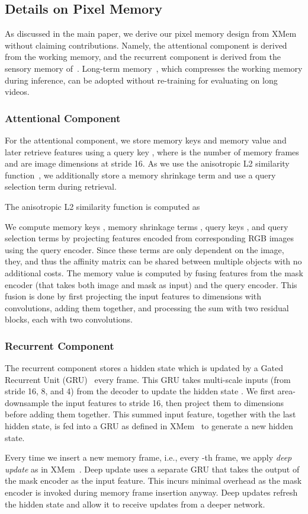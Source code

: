 \subsection{Details on Pixel Memory}
As discussed in the main paper, we derive our pixel memory design from XMem~\cite{cheng2022xmem} without claiming contributions. Namely, the attentional component is derived from the working memory, and the recurrent component is derived from the sensory memory of~\cite{cheng2022xmem}.
Long-term memory~\cite{cheng2022xmem}, which compresses the working memory during inference, can be adopted without re-training for evaluating on long videos.

\subsubsection{Attentional Component}
For the attentional component, we store memory keys  and memory value  and later retrieve features using a query key , where  is the number of memory frames and  are image dimensions at stride 16.
As we use the anisotropic L2 similarity function~\cite{cheng2022xmem}, we additionally store a memory shrinkage  term and use a query selection term  during retrieval.

The anisotropic L2 similarity function  is computed as

We compute memory keys , memory shrinkage terms , query keys , and query selection terms  by projecting features encoded from corresponding RGB images using the query encoder.
Since these terms are only dependent on the image, they, and thus the affinity matrix  can be shared between multiple objects with no additional costs.
The memory value  is computed by fusing features from the mask encoder (that takes both image and mask as input) and the query encoder. This fusion is done by first projecting the input features to  dimensions with  convolutions, adding them together, and processing the sum with two residual blocks, each with two  convolutions.

\subsubsection{Recurrent Component}
The recurrent component stores a hidden state  which is updated by a Gated Recurrent Unit (GRU)~\cite{cho2014propertiesGRU} every frame. 
This GRU takes multi-scale inputs (from stride 16, 8, and 4) from the decoder to update the hidden state .
We first area-downsample the input features to stride 16, then project them to  dimensions before adding them together. This summed input feature, together with the last hidden state, is fed into a GRU as defined in XMem~\cite{cheng2022xmem} to generate a new hidden state. 

Every time we insert a new memory frame, i.e., every -th frame, we apply \textit{deep update} as in XMem~\cite{cheng2022xmem}. Deep update uses a separate GRU that takes the output of the mask encoder as the input feature. This incurs minimal overhead as the mask encoder is invoked during memory frame insertion anyway. Deep updates refresh the hidden state and allow it to receive updates from a deeper network.

